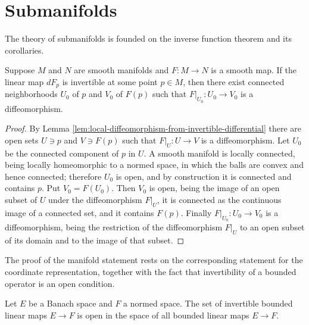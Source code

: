\section{Submanifolds}

The theory of submanifolds is founded on the inverse function theorem and its corollaries.

\begin{theorem}
\label{thm:inverse-function-theorem-manifolds}
\leanok
{}
Suppose $M$ and $N$ are smooth manifolds and $F: M \to N$ is a smooth map. If the linear map $dF_p$ is invertible at some point $p \in M$, then there exist connected neighborhoods $U_0$ of $p$ and $V_0$ of $F(p)$ such that $F|_{U_0}: U_0 \to V_0$ is a diffeomorphism.
\end{theorem}

\begin{proof}
\leanok
{}
By Lemma \ref{lem:local-diffeomorphism-from-invertible-differential} there are open sets $U \ni p$ and $V \ni F(p)$ such that $F|_U : U \to V$ is a diffeomorphism. Let $U_0$ be the connected component of $p$ in $U$. A smooth manifold is locally connected, being locally homeomorphic to a normed space, in which the balls are convex and hence connected; therefore $U_0$ is open, and by construction it is connected and contains $p$. Put $V_0 = F(U_0)$. Then $V_0$ is open, being the image of an open subset of $U$ under the diffeomorphism $F|_U$, it is connected as the continuous image of a connected set, and it contains $F(p)$. Finally $F|_{U_0} : U_0 \to V_0$ is a diffeomorphism, being the restriction of the diffeomorphism $F|_U$ to an open subset of its domain and to the image of that subset.
\end{proof}

The proof of the manifold statement rests on the corresponding statement for the coordinate representation, together with the fact that invertibility of a bounded operator is an open condition.

\begin{lemma}
\label{lem:invertible-operators-open}
\leanok
Let $E$ be a Banach space and $F$ a normed space. The set of invertible bounded linear maps $E \to F$ is open in the space of all bounded linear maps $E \to F$.
\end{lemma}

